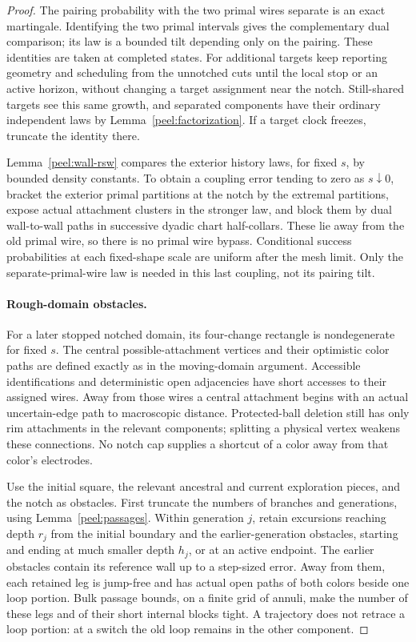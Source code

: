 \begin{proof}
The pairing probability with the two primal wires separate is an
exact martingale.  Identifying the two primal intervals gives the
complementary dual comparison; its law is a bounded tilt depending
only on the pairing.  These identities are taken at completed states.
For additional targets keep reporting geometry and scheduling from
the unnotched cuts until the local stop or an active horizon, without
changing a target assignment near the notch.  Still-shared targets
see this same growth, and separated components have their ordinary
independent laws by Lemma~\ref{peel:factorization}.  If a target clock
freezes, truncate the identity there.

Lemma~\ref{peel:wall-rsw} compares the exterior history laws, for fixed
$s$, by bounded density constants.  To obtain a coupling error tending
to zero as $s\downarrow0$, bracket the exterior primal partitions at
the notch by the extremal partitions, expose actual attachment
clusters in the stronger law, and block them by dual wall-to-wall
paths in successive dyadic chart half-collars.  These lie away from
the old primal wire, so there is no primal wire bypass.  Conditional
success probabilities at each fixed-shape scale are uniform after
the mesh limit.  Only the separate-primal-wire law is needed in this
last coupling, not its pairing tilt.

\paragraph{Rough-domain obstacles.}
For a later stopped notched domain, its four-change rectangle is
nondegenerate for fixed $s$.  The central possible-attachment vertices
and their optimistic color paths are defined exactly as in the
moving-domain argument.  Accessible identifications and deterministic
open adjacencies have short accesses to their assigned wires.
Away from those wires a central attachment begins with an actual
uncertain-edge path to macroscopic distance.  Protected-ball deletion
still has only rim attachments in the relevant components; splitting
a physical vertex weakens these connections.  No notch cap supplies
a shortcut of a color away from that color's electrodes.

Use the initial square, the relevant ancestral and current exploration
pieces, and the notch as obstacles.  First truncate the numbers of
branches and generations, using Lemma~\ref{peel:passages}.  Within
generation $j$, retain excursions reaching depth $r_j$ from the initial
boundary and the earlier-generation obstacles, starting and ending at
much smaller depth $h_j$, or at an active endpoint.  The earlier
obstacles contain its reference wall up to a step-sized error.  Away
from them, each retained leg is jump-free and has actual open paths
of both colors beside one loop portion.  Bulk passage bounds, on a
finite grid of annuli, make the number of these legs and of their
short internal blocks tight.  A trajectory does not retrace a loop
portion: at a switch the old loop remains in the other component.


\end{proof}
